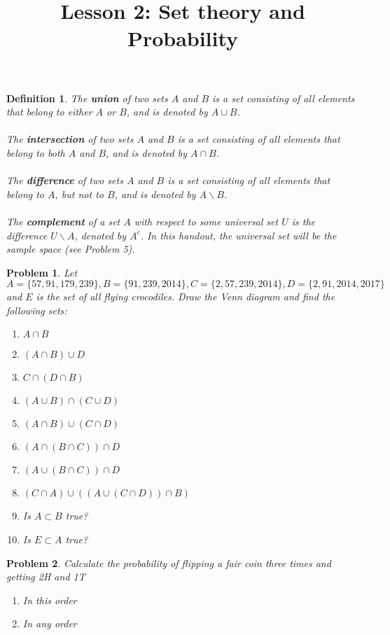\documentclass[a4paper,12pt]{article}
\title{Lesson 2: Set theory and Probability }
\theoremstyle{perfect}
\newtheorem{dfn}{Definition}
\newtheorem{prb}{Problem}
\begin{document}
 
\maketitle

\begin{dfn}
The \textbf{union} of two sets $A$ and $B$ is a set consisting of all elements that belong to either $A$ or $B$, and is denoted by $A \cup B$.\\
\\
The \textbf{intersection} of two sets $A$ and $B$ is a set consisting of all elements that belong to both $A$ and $B$, and is denoted by $A \cap B$. \\ 
\\
The \textbf{difference} of two sets $A$ and $B$ is a set consisting of all elements that belong to $A$, but not to $B$, and is denoted by $A \backslash B$. \\
\\
The \textbf{complement} of a set $A$ with respect to some universal set $U$ is the difference $U \backslash A$, denoted by $A^c$. In this handout, the universal set will be the sample space (see Problem 5).
\end{dfn}

\begin{prb}
Let $A = \{57, 91, 179, 239\}, B = \{91, 239, 2014\}, C = \{2, 57, 239, 2014\},
D = \{2, 91, 2014, 2017\}$ and $E$ is the set of all flying crocodiles. 
Draw the Venn diagram and find the following sets:
\begin{enumerate}
\item  $A \cap B$
\item $(A \cap B) \cup D$
\item $C \cap (D \cap B)$
\item $(A \cup B) \cap (C \cup D)$
\item $(A \cap B) \cup (C \cap D)$ 
\item $(A \cap (B \cap C)) \cap D$
\item $(A \cup (B \cap C)) \cap D$
\item $(C \cap A) \cup ((A \cup (C \cap D)) \cap B)$
\item Is $A \subset B$ true?
\item Is $E \subset A$ true?
\end{enumerate}

\end{prb}

\begin{prb}
Calculate the probability of flipping a fair coin three times and getting 2H and 1T 
\begin{enumerate}
\item In this order
\item In any order
\end{enumerate}
\end{prb} 
\end{document}
